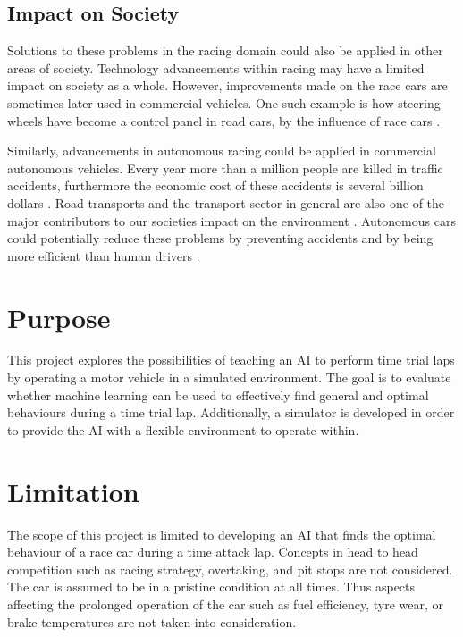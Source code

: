 \subsection{Impact on Society}

Solutions to these problems in the racing domain could also be applied in other areas of society. Technology advancements within racing may have a limited impact on society as a whole. However, improvements made on the race cars are sometimes later used in commercial vehicles. One such example is how steering wheels have become a control panel in road cars, by the influence of race cars \cite{gkikas}. 

Similarly, advancements in autonomous racing could be applied in commercial autonomous vehicles. Every year more than a million people are killed in traffic accidents, furthermore the economic cost of these accidents is several billion dollars \cite{who:traffic}. Road transports and the transport sector in general are also one of the major contributors to our societies impact on the environment \cite{fuglestvedt2008climate}.
Autonomous cars could potentially reduce these problems by preventing accidents and by being more efficient than human drivers \cite{anderson}.


\section{Purpose}
\label{purpose}
This project explores the possibilities of teaching an AI to perform time trial laps by operating a motor vehicle in a simulated environment. The goal is to evaluate whether machine learning can be used to effectively find general and optimal behaviours during a time trial lap. Additionally, a simulator is developed in order to provide the AI with a flexible environment to operate within.

\section{Limitation}
The scope of this project is limited to developing an AI that finds the optimal behaviour of a race car during a time attack lap. Concepts in head to head competition such as racing strategy, overtaking, and pit stops are not considered. The car is assumed to be in a pristine condition at all times. Thus aspects affecting the prolonged operation of the car such as fuel efficiency, tyre wear, or brake temperatures are not taken into consideration. 

